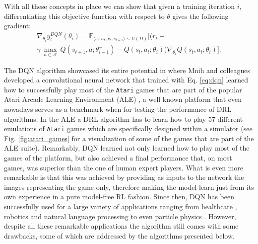 With all these concepts in place we can show that given a training iteration $i$, differentiating this objective function with respect to $\theta$ gives the following gradient: 
\begin{multline}
\nabla_{\theta_{i}}y^{DQN}_{t}(\theta_{i}) = \mathds{E}_{\langle s_{t},a_{t},r_{t},s_{t+1}\rangle\sim U(D)} \bigg[\big(r_{t} + \\ \gamma \: \underset{a\in \mathcal{A}}{\max}\: Q(s_{t+1}, a; \theta^{-}_{i-1})  - Q(s_{t}, a_{t}; \theta_{i})\big)\nabla_{\theta_{i}} Q(s_{t}, a_{t}; \theta_{i})\bigg].
\label{eq:dqn_gradient}
\end{multline}

The DQN algorithm showcased its entire potential in \cite{mnih2015human} where Mnih and colleagues developed a convolutional neural network that trained with Eq. \ref{eq:dqn} learned how to successfully play most of the \texttt{Atari} games that are part of the popular Atari Arcade Learning Environment (ALE) \cite{bellemare2013arcade}, a well known platform that even nowadays serves as a benchmark when for testing the performance of DRL algorithms. In the ALE a DRL algorithm has to learn how to play $57$ different emulations of \texttt{Atari} games which are specifically designed within a simulator (see Fig. \ref{fig:atari_games} for a visualization of some of the games that are part of the ALE suite). Remarkably, DQN learned not only learned how to play most of the games of the platform, but also achieved a final performance that, on most games, was superior than the one of human expert players. What is even more remarkable is that this was achieved by providing as inputs to the network the images representing the game only, therefore making the model learn just from its own experience in a pure model-free RL fashion. Since then, DQN has been successfully used for a large variety of applications ranging from healthcare \cite{tseng2017deep,raghu2017continuous}, robotics \cite{kalashnikov2018qt} and natural language processing \cite{he2015deep, narasimhan2015language} to even particle physics \cite{liu2017learning, sajedian2020design}. However, despite all these remarkable applications the algorithm still comes with some drawbacks, some of which are addressed by the algorithms presented below.

